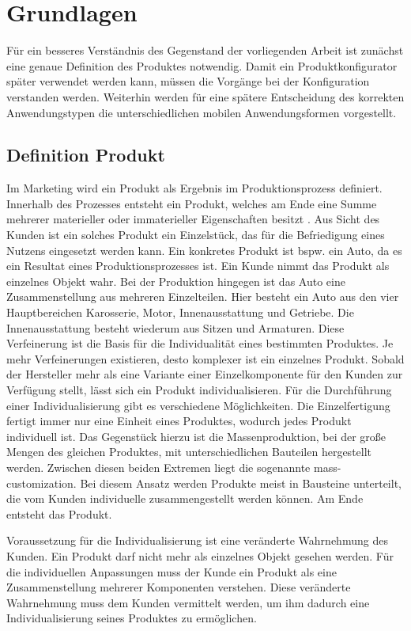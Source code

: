 \chapter{Grundlagen} \label{chapter_2}
Für ein besseres Verständnis des Gegenstand der vorliegenden Arbeit ist zunächst eine genaue Definition des Produktes notwendig. Damit ein Produktkonfigurator später verwendet werden kann, müssen die Vorgänge bei der Konfiguration verstanden werden. Weiterhin werden für eine spätere Entscheidung des korrekten Anwendungstypen die unterschiedlichen mobilen Anwendungsformen vorgestellt.


\section{Definition Produkt}
Im Marketing wird ein Produkt als Ergebnis im Produktionsprozess definiert. Innerhalb des Prozesses entsteht ein Produkt, welches am Ende eine Summe mehrerer materieller oder immaterieller Eigenschaften besitzt \cite{bib:product}. Aus Sicht des Kunden ist ein solches Produkt ein Einzelstück, das für die Befriedigung eines Nutzens eingesetzt werden kann. Ein konkretes Produkt ist bspw. ein Auto, da es ein Resultat eines Produktionsprozesses ist. Ein Kunde nimmt das Produkt als einzelnes Objekt wahr. Bei der Produktion hingegen ist das Auto eine Zusammenstellung aus mehreren Einzelteilen. Hier besteht ein Auto aus den vier Hauptbereichen Karosserie, Motor, Innenausstattung und Getriebe. Die Innenausstattung besteht wiederum aus Sitzen und Armaturen. Diese Verfeinerung ist die Basis für die Individualität eines bestimmten Produktes. Je mehr Verfeinerungen existieren, desto komplexer ist ein einzelnes Produkt. Sobald der Hersteller mehr als eine Variante einer Einzelkomponente für den Kunden zur Verfügung stellt, lässt sich ein Produkt individualisieren. Für die Durchführung einer Individualisierung gibt es verschiedene Möglichkeiten. Die Einzelfertigung fertigt immer nur eine Einheit eines Produktes, wodurch jedes Produkt individuell ist. Das Gegenstück hierzu ist die Massenproduktion, bei der große Mengen des gleichen Produktes, mit unterschiedlichen Bauteilen hergestellt werden. Zwischen diesen beiden Extremen liegt die sogenannte mass-customization. Bei diesem Ansatz werden Produkte meist in Bausteine unterteilt, die vom Kunden individuelle zusammengestellt werden können. Am Ende entsteht das Produkt.
 \par 

Voraussetzung für die Individualisierung ist eine veränderte Wahrnehmung des Kunden. Ein Produkt darf nicht mehr als einzelnes Objekt gesehen werden. Für die individuellen Anpassungen muss der Kunde ein Produkt als eine Zusammenstellung mehrerer Komponenten verstehen. Diese veränderte Wahrnehmung muss dem Kunden vermittelt werden, um ihm dadurch eine Individualisierung seines Produktes zu ermöglichen. \par

